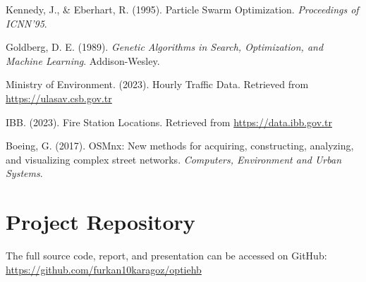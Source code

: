 \documentclass[conference]{IEEEtran}
\begin{document}
\begin{thebibliography}{9}

Kennedy, J., \& Eberhart, R. (1995). Particle Swarm Optimization.
\textit{Proceedings of ICNN’95}.

Goldberg, D. E. (1989). \textit{Genetic Algorithms in Search, Optimization,
and Machine Learning}. Addison-Wesley.

Ministry of Environment. (2023). Hourly Traffic Data. Retrieved from \url{https://ulasav.csb.gov.tr}

IBB. (2023). Fire Station Locations. Retrieved from \url{https://data.ibb.gov.tr}

Boeing, G. (2017). OSMnx: New methods for acquiring, constructing,
analyzing, and visualizing complex street networks. \textit{Computers, Environment and Urban Systems}.

\end{thebibliography}
\vspace{1em}
\section*{Project Repository}
The full source code, report, and presentation can be accessed on GitHub: \\
\url{https://github.com/furkan10karagoz/optiehb}
\end{document}
